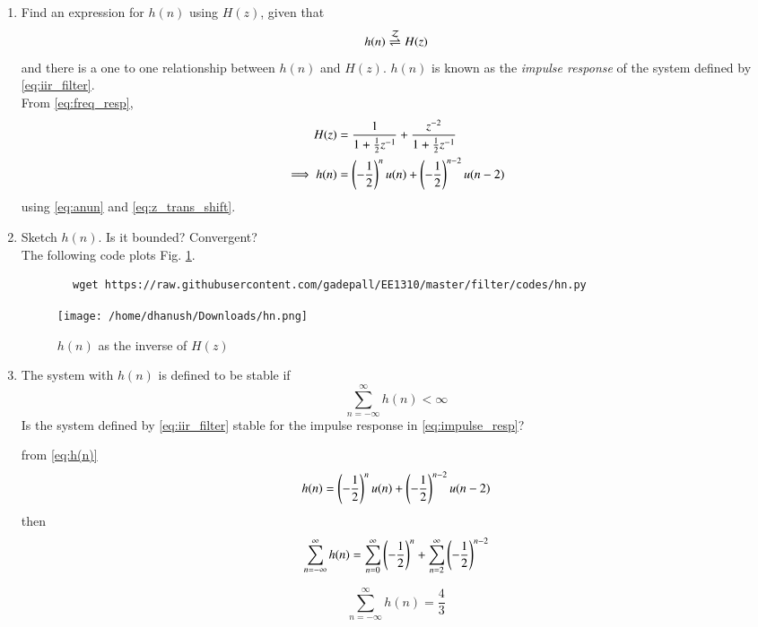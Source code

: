 \documentclass[journal,12pt,twocolumn]{IEEEtran}
\renewcommand\thesection{\arabic{section}}
\begin{document}
\begin{enumerate}[label=\thesection.\arabic*]
	\item \label{prob:impulse_resp}
	Find an expression for $h(n)$ using $H(z)$, given that 
	\begin{equation}
		\label{eq:impulse_resp}
		h(n) \overset{\mathcal{Z}}{ \rightleftharpoons} H(z)
	\end{equation}
	and there is a one to one relationship between $h(n)$ and $H(z)$. $h(n)$ is known as the {\em impulse response} of the
	system defined by \eqref{eq:iir_filter}.
	\\
	\solution From \eqref{eq:freq_resp},\\
	\begin{align}
		H(z) &= \frac{1}{1 + \frac{1}{2}z^{-1}} + \frac{ z^{-2}}{1 + \frac{1}{2}z^{-1}}
		\\
		\implies h(n) &= \left(-\frac{1}{2}\right)^{n}u(n) + \left(-\frac{1}{2}\right)^{n-2}u(n-2) \label{eq:h(n)}
	\end{align}
	using \eqref{eq:anun} and \eqref{eq:z_trans_shift}.
	\item Sketch $h(n)$. Is it bounded? Convergent? 
	\\
	\solution The following code plots Fig. \ref{fig:hn}.
	\begin{lstlisting}
		wget https://raw.githubusercontent.com/gadepall/EE1310/master/filter/codes/hn.py
	\end{lstlisting}
	\begin{figure}[!ht]
		\centering
		\texttt{[image: /home/dhanush/Downloads/hn.png]}
		\caption{$h(n)$ as the inverse of $H(z)$}
		\label{fig:hn}
	\end{figure}
	\item The system with $h(n)$ is defined to be stable if
	\begin{equation}
		\sum_{n=-\infty}^{\infty}h(n) < \infty
	\end{equation}
	Is the system defined by \eqref{eq:iir_filter} stable for the impulse response in \eqref{eq:impulse_resp}?
	
	\solution from \ref{eq:h(n)}
	\begin{equation}
		h(n) = \left(-\frac{1}{2}\right)^{n}u(n) + \left(-\frac{1}{2}\right)^{n-2}u(n-2) 
	\end{equation}
	then 
	\begin{equation}
		\sum_{n=-\infty}^{\infty}h(n) = \sum_{n=0}^{\infty} \left(-\frac{1}{2}\right)^{n} + \sum_{n=2}^{\infty} \left(-\frac{1}{2}\right)^{n-2}
	\end{equation}
	
	\begin{equation}
		\sum_{n=-\infty}^{\infty}h(n) = \frac{4}{3}
	\end{equation}
	

\end{enumerate}
\end{document}
